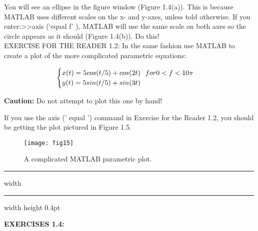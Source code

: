 \documentclass[../main.tex]{subfiles}
\begin{document}
You will see an ellipse in the figure window (Figure 1.4(a)). This is because MATLAB uses different scales on the x- and y-axes, unless told otherwise. If you enter:>>axis (`equal f' ), MATLAB will use the same scale on both axes so the circle appears as it should (Figure 1.4(b)). Do this!\\

EXERCISE FOR THE READER 1.2: In the same fashion use MATLAB to create
a plot of the more complicated parametric equations:

\[\begin{cases}
    x(t) = 5cos(t/5) + cos(2t) \hspace{0.25cm} for  0<f<10\pi \\
    y(t) = 5sin(t/5) + sin(3t)
  \end{cases}
\]

\textbf{Caution: }  Do not attempt to plot this one by hand!

If you use the axis (' equal ') command in Exercise for the Reader 1.2, you
should be getting the plot pictured in Figure 1.5.

\begin{figure}[H]
\centering
\texttt{[image: fig15]}
\caption{A complicated MATLAB parametric plot. }
\label{fig:fig_1_5}
\end{figure}

\hrule width \hsize \kern 1pt \hrule width \hsize height 0.4pt

\hspace{0.1cm}

\textbf{EXERCISES 1.4: }
\end{document}
